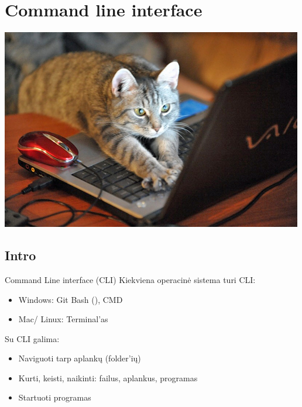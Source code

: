 \documentclass[11pt,xcolor=table]{beamer}
\begin{document}
\section{Command line interface}

\begin{frame}
\center
\includegraphics[scale=0.5]{cat_pc.jpeg}
\end{frame}

\subsection{Intro}

\begin{frame}{Command Line interface (CLI)}
Kiekviena operacinė sistema turi CLI:
\begin{itemize}
\item Windows: Git Bash (), CMD
\item Mac/ Linux: Terminal'as
\end{itemize}
Su CLI galima:
\begin{itemize}
\item Naviguoti tarp aplankų (folder'ių)
\item Kurti, keisti, naikinti: failus, aplankus, programas
\item Startuoti programas
\end{itemize}
\end{frame}
\end{document}
